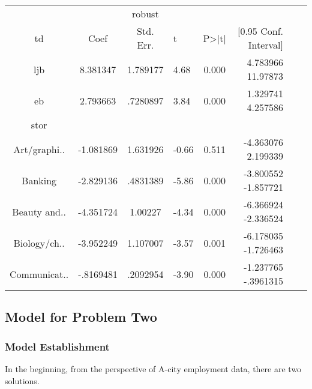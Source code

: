 \documentclass{mcmthesis}
\begin{document}
\begin{center}
	\begin{tabular}{c|cclcrcc}
		\hline
		&  & robust & & &  \\
		td & Coef & Std. Err. & t & P>|t| & [0.95 Conf. Interval] \\
		\hline
		ljb & 8.381347 & 1.789177 & 4.68 & 0.000 & 4.783966  11.97873 \\
		eb & 2.793663 & .7280897 & 3.84 & 0.000 & 1.329741  4.257586  \\
		stor &      &     &     &      &   \\
		Art/graphi.. & -1.081869&1.631926&-0.66&0.511&-4.363076  2.199339 \\
		Banking&-2.829136&.4831389&-5.86&0.000 &-3.800552  -1.857721 \\
		Beauty and.. & -4.351724 &1.00227 & -4.34&0.000&-6.366924  -2.336524 \\
		Biology/ch.. &-3.952249 &1.107007 &-3.57&0.001& -6.178035  -1.726463 \\
		Communicat.. & -.8169481 &.2092954 & -3.90&0.000& -1.237765  -.3961315 \\
		\hline
	\end{tabular}
\end{center}

\subsection{Model for Problem Two}
\subsubsection{Model Establishment}
In the beginning, from the perspective of A-city employment data, there are two solutions.
\end{document}
